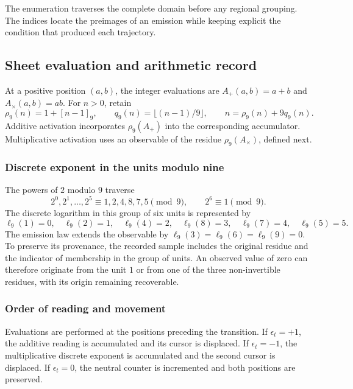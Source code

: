 The enumeration traverses the complete domain before any regional
grouping. The indices locate the preimages of an emission while keeping
explicit the condition that produced each trajectory.

\subsection{Sheet evaluation and arithmetic record}
\label{act21:tpk:lecturas}

At a positive position \((a,b)\), the integer evaluations are
\(A_+(a,b)=a+b\) and \(A_\times(a,b)=ab\). For \(n>0\), retain
\begin{equation}
 \rho_9(n)=1+[n-1]_9,\qquad
 q_9(n)=\lfloor(n-1)/9\rfloor,\qquad
 n=\rho_9(n)+9q_9(n).
 \label{act21:tpk:division-evaluacion}
\end{equation}
Additive activation incorporates \(\rho_9(A_+)\) into the corresponding
accumulator. Multiplicative activation uses an observable of the residue
\(\rho_9(A_\times)\), defined next.

\subsubsection{Discrete exponent in the units modulo nine}

The powers of \(2\) modulo \(9\) traverse
\[
 2^0,2^1,\ldots,2^5\equiv1,2,4,8,7,5\pmod9,
 \qquad 2^6\equiv1\pmod9.
\]
The discrete logarithm in this group of six units is represented by
\begin{equation}
 \ell_9(1)=0,\quad\ell_9(2)=1,\quad\ell_9(4)=2,
 \quad\ell_9(8)=3,\quad\ell_9(7)=4,\quad\ell_9(5)=5.
 \label{act21:tpk:logaritmo}
\end{equation}
The emission law extends the observable by
\(\ell_9(3)=\ell_9(6)=\ell_9(9)=0\). To preserve its provenance, the
recorded sample includes the original residue and the indicator of
membership in the group of units. An observed value of zero can therefore
originate from the unit \(1\) or from one of the three non-invertible
residues, with its origin remaining recoverable.

\subsubsection{Order of reading and movement}

Evaluations are performed at the positions preceding the transition.
If \(\epsilon_t=+1\), the additive reading is accumulated and its cursor
is displaced. If \(\epsilon_t=-1\), the multiplicative discrete exponent
is accumulated and the second cursor is displaced. If \(\epsilon_t=0\),
the neutral counter is incremented and both positions are preserved.

